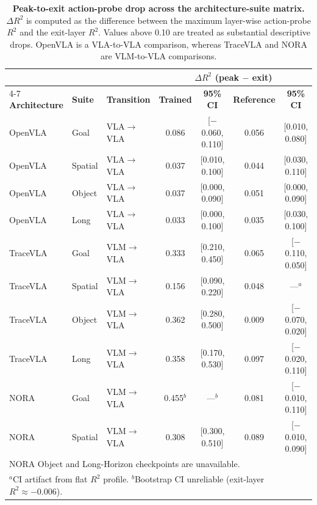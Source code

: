 \begin{table}[t]
\centering
\caption{\textbf{Peak-to-exit action-probe drop across the architecture-suite matrix.} $\Delta R^2$ is computed as the difference between the maximum layer-wise action-probe $R^2$ and the exit-layer $R^2$. Values above 0.10 are treated as substantial descriptive drops. OpenVLA is a VLA-to-VLA comparison, whereas TraceVLA and NORA are VLM-to-VLA comparisons.}
\label{tab:cross_arch_matrix}
\small
\setlength{\tabcolsep}{3pt}
\begin{tabular}{@{}lll cccc@{}}
\toprule
& & & \multicolumn{4}{c}{\textbf{$\Delta R^2$ (peak $-$ exit)}} \\
\cmidrule(l){4-7}
\textbf{Architecture} & \textbf{Suite} & \textbf{Transition} & \textbf{Trained} & \textbf{95\% CI} & \textbf{Reference} & \textbf{95\% CI} \\
\midrule
OpenVLA & Goal    & VLA$\to$VLA & 0.086 & [$-$0.060, 0.110] & 0.056 & [0.010, 0.080] \\
OpenVLA & Spatial & VLA$\to$VLA & 0.037 & [0.010, 0.100]    & 0.044 & [0.030, 0.110] \\
OpenVLA & Object  & VLA$\to$VLA & 0.037 & [0.000, 0.090]    & 0.051 & [0.000, 0.090] \\
OpenVLA & Long    & VLA$\to$VLA & 0.033 & [0.000, 0.100]    & 0.035 & [0.030, 0.100] \\
\midrule
TraceVLA & Goal    & VLM$\to$VLA & 0.333 & [0.210, 0.450]    & 0.065 & [$-$0.110, 0.050] \\
TraceVLA & Spatial & VLM$\to$VLA & 0.156 & [0.090, 0.220]    & 0.048 & ---$^{a}$ \\
TraceVLA & Object  & VLM$\to$VLA & 0.362 & [0.280, 0.500]    & 0.009 & [$-$0.070, 0.020] \\
TraceVLA & Long    & VLM$\to$VLA & 0.358 & [0.170, 0.530]    & 0.097 & [$-$0.020, 0.110] \\
\midrule
NORA    & Goal    & VLM$\to$VLA & 0.455$^{b}$ & ---$^{b}$  & 0.081 & [$-$0.010, 0.110] \\
NORA    & Spatial & VLM$\to$VLA & 0.308 & [0.300, 0.510]    & 0.089 & [$-$0.010, 0.090] \\
\bottomrule
\multicolumn{7}{l}{\footnotesize NORA Object and Long-Horizon checkpoints are unavailable.}\\
\multicolumn{7}{l}{\footnotesize $^{a}$CI artifact from flat $R^2$ profile. $^{b}$Bootstrap CI unreliable (exit-layer $R^2 \approx -0.006$).}\\
\end{tabular}
\end{table}

